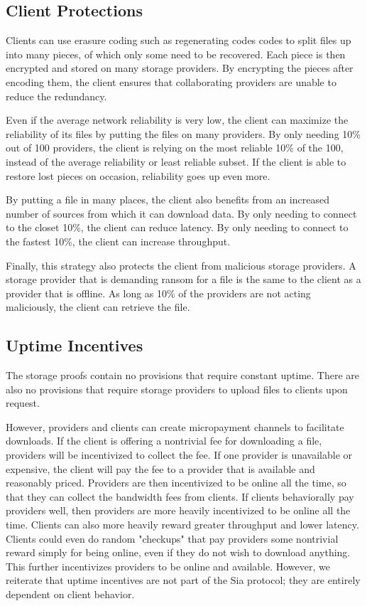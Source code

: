 \documentclass[twocolumn]{article}
\begin{document}
\subsection{Client Protections}
Clients can use erasure coding such as regenerating codes \cite{reg} codes to split files up into many pieces, of which only some need to be recovered.
Each piece is then encrypted and stored on many storage providers.
By encrypting the pieces after encoding them, the client ensures that collaborating providers are unable to reduce the redundancy.

Even if the average network reliability is very low, the client can maximize the reliability of its files by putting the files on many providers.
By only needing 10\% out of 100 providers, the client is relying on the most reliable 10\% of the 100, instead of the average reliability or least reliable subset.
If the client is able to restore lost pieces on occasion, reliability goes up even more.

By putting a file in many places, the client also benefits from an increased number of sources from which it can download data.
By only needing to connect to the closet 10\%, the client can reduce latency.
By only needing to connect to the fastest 10\%, the client can increase throughput.

Finally, this strategy also protects the client from malicious storage providers.
A storage provider that is demanding ransom for a file is the same to the client as a provider that is offline.
As long as 10\% of the providers are not acting maliciously, the client can retrieve the file.

\subsection{Uptime Incentives}
The storage proofs contain no provisions that require constant uptime.
There are also no provisions that require storage providers to upload files to clients upon request.

However, providers and clients can create micropayment channels to facilitate downloads.
If the client is offering a nontrivial fee for downloading a file, providers will be incentivized to collect the fee.
If one provider is unavailable or expensive, the client will pay the fee to a provider that is available and reasonably priced.
Providers are then incentivized to be online all the time, so that they can collect the bandwidth fees from clients.
If clients behaviorally pay providers well, then providers are more heavily incentivized to be online all the time.
Clients can also more heavily reward greater throughput and lower latency.
Clients could even do random "checkups" that pay providers some nontrivial reward simply for being online, even if they do not wish to download anything.
This further incentivizes providers to be online and available.
However, we reiterate that uptime incentives are not part of the Sia protocol; they are entirely dependent on client behavior.
\end{document}
